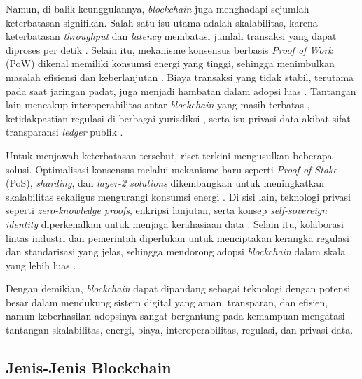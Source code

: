 Namun, di balik keunggulannya, \textit{blockchain} juga menghadapi sejumlah keterbatasan signifikan. Salah satu isu utama adalah skalabilitas, karena keterbatasan \textit{throughput} dan \textit{latency} membatasi jumlah transaksi yang dapat diproses per detik \cite{ahmed2025, akhtar2025, monrat2019, guo2022, bernabe2019, deepak2024}. Selain itu, mekanisme konsensus berbasis \textit{Proof of Work} (PoW) dikenal memiliki konsumsi energi yang tinggi, sehingga menimbulkan masalah efisiensi dan keberlanjutan \cite{akhtar2025, guo2022, walia2025, paul2024, khan2024}. Biaya transaksi yang tidak stabil, terutama pada saat jaringan padat, juga menjadi hambatan dalam adopsi luas \cite{monrat2019, paul2024, bernabe2019}. Tantangan lain mencakup interoperabilitas antar \textit{blockchain} yang masih terbatas \cite{ahmed2025, monrat2019, paul2024, alhat2024}, ketidakpastian regulasi di berbagai yurisdiksi \cite{akhtar2025, monrat2019, paul2024, bernabe2019, kakashvili2024}, serta isu privasi data akibat sifat transparansi \textit{ledger} publik \cite{monrat2019, guo2022, paul2024, vallejo2024}.

Untuk menjawab keterbatasan tersebut, riset terkini mengusulkan beberapa solusi. Optimalisasi konsensus melalui mekanisme baru seperti \textit{Proof of Stake} (PoS), \textit{sharding}, dan \textit{layer-2 solutions} dikembangkan untuk meningkatkan skalabilitas sekaligus mengurangi konsumsi energi \cite{akhtar2025, guo2022, alhat2024}. Di sisi lain, teknologi privasi seperti \textit{zero-knowledge proofs}, enkripsi lanjutan, serta konsep \textit{self-sovereign identity} diperkenalkan untuk menjaga kerahasiaan data \cite{guo2022, paul2024, vallejo2024}. Selain itu, kolaborasi lintas industri dan pemerintah diperlukan untuk menciptakan kerangka regulasi dan standarisasi yang jelas, sehingga mendorong adopsi \textit{blockchain} dalam skala yang lebih luas \cite{ahmed2025, akhtar2025, monrat2019, paul2024, bernabe2019, kakashvili2024}.

Dengan demikian, \textit{blockchain} dapat dipandang sebagai teknologi dengan potensi besar dalam mendukung sistem digital yang aman, transparan, dan efisien, namun keberhasilan adopsinya sangat bergantung pada kemampuan mengatasi tantangan skalabilitas, energi, biaya, interoperabilitas, regulasi, dan privasi data.


\subsection{Jenis-Jenis Blockchain}

